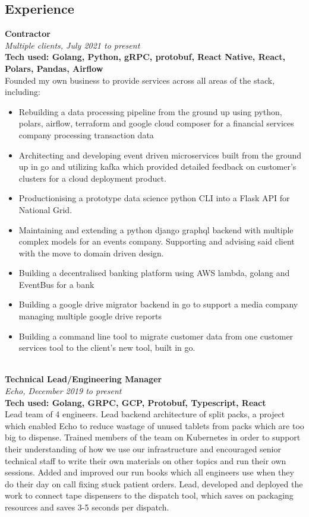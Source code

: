 \documentclass{article}
\begin{document}
\begin{flushleft}
\section*{Experience}
\textbf{Contractor}\\
\textit{Multiple clients, July 2021 to present}\\
\textbf{Tech used: Golang, Python, gRPC, protobuf, React Native, React, Polars, Pandas, Airflow}\\[5pt]
Founded my own business to provide services across all areas of the stack, including:
\begin{itemize}
	\item Rebuilding a data processing pipeline from the ground up using python, polars, airflow, terraform and google cloud composer for a financial services company processing transaction data
	\item Architecting and developing event driven microservices built from the ground up in go and utilizing kafka which provided detailed feedback on customer’s clusters for a cloud deployment product.
	\item Productionising a prototype data science python CLI into a Flask API for National Grid.
	\item Maintaining and extending a python django graphql backend with multiple complex models for an events company. Supporting and advising said client with the move to domain driven design.
	\item Building a decentralised banking platform using AWS lambda, golang and EventBus for a bank
	\item Building a google drive migrator backend in go to support a media company managing multiple google drive reports
	\item Building a command line tool to migrate customer data from one customer services tool to the client’s new tool, built in go.
\end{itemize}\\[10pt]

\textbf{Technical Lead/Engineering Manager}\\
\textit{Echo, December 2019 to present}\\
\textbf{Tech used: Golang, GRPC, GCP, Protobuf, Typescript, React}\\[5pt]
Lead team of 4 engineers. Lead backend architecture of split packs, a project which enabled Echo to reduce wastage of unused tablets from packs which are too big to dispense. Trained members of the team on Kubernetes in order to support their understanding of how we use our infrastructure and encouraged senior technical staff to write their own materials on other topics and run their own sessions. Added and improved our run books which all engineers use when they do their day on call fixing stuck patient orders. Lead, developed and deployed the work to connect tape dispensers to the dispatch tool, which saves on packaging resources and saves 3-5 seconds per dispatch.
\\[10pt]


\end{flushleft}
\end{document}
